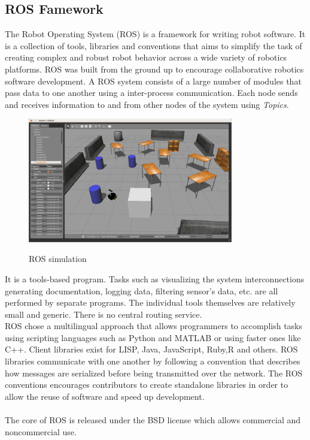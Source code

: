\subsection{ROS Famework}
The Robot Operating System (ROS) is a framework  for writing robot software. It is a collection of tools, libraries and conventions that aims to simplify the task of creating complex and robust robot behavior across a wide variety of robotics platforms. 
ROS was built from the ground up to encourage collaborative robotics software development. A ROS system consists of a large number of modules that pass data to one another using a inter-process communication. Each node sends and receives information to and from other nodes of the system using \textit{Topics}.
\\
\begin{figure}[H]
\centering
\includegraphics[width=0.8\textwidth]{imgs/gazebo1.png}
\label{fig:gazebo1}
\caption{ROS simulation}
\end{figure}

It is a tools-based program. Tasks such as visualizing the system interconnections generating documentation, logging data, filtering sensor's data, etc. are all performed by separate programs. The individual tools themselves are relatively small and generic. There is no central routing service.
\\
ROS chose a multilingual approach that allows programmers to accomplish tasks using scripting languages such as Python and MATLAB or using faster ones like C++. Client libraries exist for LISP, Java, JavaScript, Ruby,R and others. ROS libraries communicate with one another by following a convention that describes how messages are serialized before being transmitted over the network. The ROS conventions encourages contributors to create standalone libraries in order to allow the reuse of software and speed up development.\\
\\
The core of ROS is released under the BSD license which allows commercial and noncommercial use.

